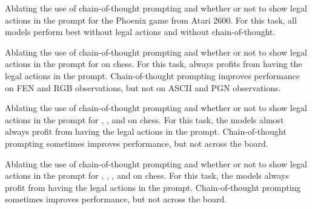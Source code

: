 \begin{table}
    \caption{
        Ablating the use of chain-of-thought prompting and whether or not to show legal actions in the prompt for the Phoenix game from Atari 2600.
        For this task, all models perform best without legal actions and without chain-of-thought.
    }
    \begin{center}
        \resizebox{0.55\textwidth}{!}{}
    \end{center}
    \label{tab:atari-ablation}
\end{table}

\begin{table}
    \caption{
        Ablating the use of chain-of-thought prompting and whether or not to show legal actions in the prompt for \claude{} on chess.
        For this task, \claude{} always profits from having the legal actions in the prompt.
        Chain-of-thought prompting improves performance on FEN and RGB observations, but not on ASCII and PGN observations.
    }
    \begin{center}
        \resizebox{0.55\textwidth}{!}{}
    \end{center}
    \label{tab:chess-ablation-anthropic}
\end{table}

\begin{table}
    \caption{
        Ablating the use of chain-of-thought prompting and whether or not to show legal actions in the prompt for \flash{}, \pro{}, and \expflash{} on chess.
        For this task, the models almost always profit from having the legal actions in the prompt.
        Chain-of-thought prompting sometimes improves performance, but not across the board.
    }
    \begin{center}
        \resizebox{0.55\textwidth}{!}{}
    \end{center}
    \label{tab:chess-ablation-gemini}
\end{table}

\begin{table}
    \caption{
        Ablating the use of chain-of-thought prompting and whether or not to show legal actions in the prompt for \gpt{}, \mini{}, \preview{}, and \oone{} on chess.
        For this task, the models always profit from having the legal actions in the prompt.
        Chain-of-thought prompting sometimes improves performance, but not across the board.
    }
    \begin{center}
        \resizebox{0.55\textwidth}{!}{}
    \end{center}
    \label{tab:chess-ablation-openai}
\end{table}

